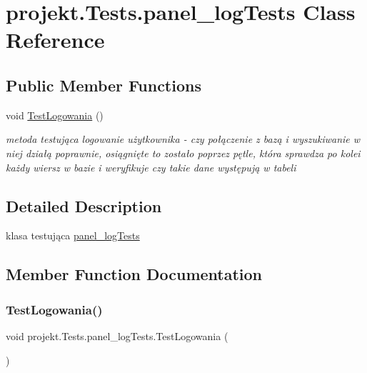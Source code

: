 \hypertarget{classprojekt_1_1_tests_1_1panel__log_tests}{}\section{projekt.\+Tests.\+panel\+\_\+log\+Tests Class Reference}
\label{classprojekt_1_1_tests_1_1panel__log_tests}


 


\subsection*{Public Member Functions}
\begin{DoxyCompactItemize}
\item 
void \mbox{\hyperlink{classprojekt_1_1_tests_1_1panel__log_tests_a0c6089b447469ddabdd5eda42f9e163b}{Test\+Logowania}} ()
\begin{DoxyCompactList}\small\item\em metoda testująca logowanie użytkownika -\/ czy połączenie z bazą i wyszukiwanie w niej działą poprawnie, osiągnięte to zostało poprzez pętle, która sprawdza po kolei każdy wiersz w bazie i weryfikuje czy takie dane występują w tabeli \end{DoxyCompactList}\end{DoxyCompactItemize}


\subsection{Detailed Description}


klasa testująca \mbox{\hyperlink{classprojekt_1_1_tests_1_1panel__log_tests}{panel\+\_\+log\+Tests}} 

\subsection{Member Function Documentation}
\mbox{\label{classprojekt_1_1_tests_1_1panel__log_tests_a0c6089b447469ddabdd5eda42f9e163b}} 
\subsubsection{\texorpdfstring{Test\+Logowania()}{TestLogowania()}}
{\footnotesize\ttfamily void projekt.\+Tests.\+panel\+\_\+log\+Tests.\+Test\+Logowania (\begin{DoxyParamCaption}{ }\end{DoxyParamCaption})\hspace{0.3cm}{\ttfamily [inline]}}




